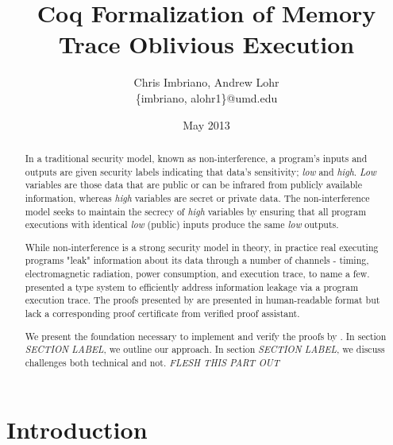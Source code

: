 \documentclass[10pt,  twocolumn]{article}
\begin{document}
\title{Coq Formalization of Memory Trace Oblivious Execution}
\author{ Chris Imbriano, Andrew Lohr \\
\{imbriano,  alohr1\}@umd.edu }
\date{May 2013}

\maketitle



\begin{abstract}
In a traditional security model, known as non-interference, a program's inputs and outputs are given security labels indicating that data's sensitivity; \emph{low} and \emph{high}.
\emph{Low} variables are those data that are public or can be infrared from publicly available information, whereas \emph{high} variables are secret or private data.
The non-interference model seeks to maintain the secrecy of \emph{high} variables by ensuring that all program executions with identical \emph{low} (public) inputs produce the same \emph{low} outputs.

While non-interference is a strong security model in theory, in practice real executing programs "leak" information about its data through a number of channels - timing, electromagnetic radiation, power consumption, and execution trace, to name a few.
\citeauthor{mtope} presented a type system to efficiently address information leakage via a program execution trace.
The proofs presented by \citeauthor{mtope} are presented in human-readable format but lack a corresponding proof certificate from verified proof assistant.

We present the foundation necessary to implement and verify the proofs by \citeauthor{mtope}.
In section \emph{SECTION LABEL}, we outline our approach.
In section \emph{SECTION LABEL}, we discuss challenges both technical and not.
\emph{FLESH THIS PART OUT}

\end{abstract}

\section{Introduction}
\label{sec:introduction}
\cite{techreport}


\end{document}
